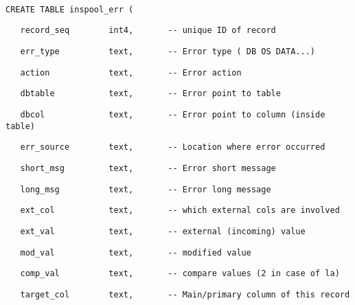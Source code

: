 \begin{table}[htbp]
\texttt{\scriptsize ~}{\scriptsize \par}

\texttt{\scriptsize CREATE TABLE inspool\_err (}{\scriptsize \par}

\texttt{\scriptsize ~~ record\_seq~~~~~~~ int4,~~~~~~
-{}- unique ID of record}{\scriptsize \par}

\texttt{\scriptsize ~~ err\_type~~~~~~~~~ text,~~~~~~
-{}- Error type ( DB OS DATA...)}{\scriptsize \par}

\texttt{\scriptsize ~~ action~~~~~~~~~~~ text,~~~~~~
-{}- Error action}{\scriptsize \par}

\texttt{\scriptsize ~~ dbtable~~~~~~~~~~ text,~~~~~~
-{}- Error point to table}{\scriptsize \par}

\texttt{\scriptsize ~~ dbcol~~~~~~~~~~~~ text,~~~~~~
-{}- Error point to column (inside table)}{\scriptsize \par}

\texttt{\scriptsize ~~ err\_source~~~~~~~ text,~~~~~~
-{}- Location where error occurred}{\scriptsize \par}

\texttt{\scriptsize ~~ short\_msg~~~~~~~~ text,~~~~~~
-{}- Error short message}{\scriptsize \par}

\texttt{\scriptsize ~~ long\_msg~~~~~~~~~ text,~~~~~~
-{}- Error long message}{\scriptsize \par}

\texttt{\scriptsize ~~ ext\_col~~~~~~~~~~ text,~~~~~~
-{}- which external cols are involved}{\scriptsize \par}

\texttt{\scriptsize ~~ ext\_val~~~~~~~~~~ text,~~~~~~
-{}- external (incoming) value}{\scriptsize \par}

\texttt{\scriptsize ~~ mod\_val~~~~~~~~~~ text,~~~~~~
-{}- modified value}{\scriptsize \par}

\texttt{\scriptsize ~~ comp\_val~~~~~~~~~ text,~~~~~~
-{}- compare values (2 in case of la)}{\scriptsize \par}

\texttt{\scriptsize ~~ target\_col~~~~~~~ text,~~~~~~
-{}- Main/primary column of this record}{\scriptsize \par}


\end{table}
